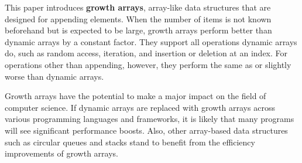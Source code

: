 This paper introduces \textbf{growth arrays}, array-like data structures that are designed for appending elements. When the number of items is not known beforehand but is expected to be large, growth arrays perform better than dynamic arrays by a constant factor. They support all operations dynamic arrays do, such as random access, iteration, and insertion or deletion at an index. For operations other than appending, however, they perform the same as or slightly worse than dynamic arrays.

Growth arrays have the potential to make a major impact on the field of computer science. If dynamic arrays are replaced with growth arrays across various programming languages and frameworks, it is likely that many programs will see significant performance boosts. Also, other array-based data structures such as circular queues and stacks stand to benefit from the efficiency improvements of growth arrays.
